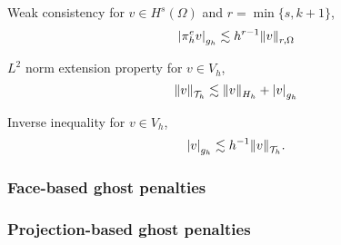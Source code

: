 \begin{assumption}[EP2]
    \label{as:EP2}
    Weak consistency for $v \in H^{s}( \Omega ) $ and $r = \min\{s, k+1\} $, \[
    \left\lvert  \pi ^{e}_{h} v  \right\rvert_{g_{h}} \lesssim  h^{r-1} \| v \|_{ r,\Omega  }^{  }
    \]
\end{assumption}

\begin{assumption}[EP3]
    \label{as:EP3}
    $L^{2}$ norm extension property for $v \in V_{h}$,\[
    \| v \|_{ \mathcal{T} _{h} }^{  } \lesssim \| v  \|_{H_{h}  }^{  }   + \left\lvert  v  \right\rvert _{g_{h}}
    \]
\end{assumption}

\begin{assumption}[EP4]
    \label{as:EP4}
    Inverse inequality for $v \in  V_{h}$,
    \[
    \left\lvert  v  \right\rvert _{g_{h}} \lesssim h^{-1} \| v \|_{ \mathcal{T} _{h} }^{  } .
    \]
\end{assumption}


\subsubsection{Face-based ghost penalties}%
\label{ssub:face_based_ghost_penalties}

\subsubsection{Projection-based ghost penalties}%
\label{ssub:projection_based_ghost_penalties}



